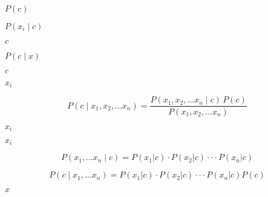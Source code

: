 \documentclass[10pt]{book}
\begin{document}
\begin{mdSnippets}
\begin{mdInlineSnippet}%
$P(c)$\end{mdInlineSnippet}%
\begin{mdInlineSnippet}%
$P(x_i \mid c)$\end{mdInlineSnippet}%
\begin{mdInlineSnippet}[4a8a08f09d37b73795649038408b5f33]%
$c$\end{mdInlineSnippet}%
\begin{mdInlineSnippet}[270623c12b8c5966e12b468eb215e89a]%
$P(c \mid x)$\end{mdInlineSnippet}%
\begin{mdInlineSnippet}[4a8a08f09d37b73795649038408b5f33]%
$c$\end{mdInlineSnippet}%
\begin{mdInlineSnippet}%
$x_i$\end{mdInlineSnippet}%
\begin{mdDisplaySnippet}%
\[%
P(c \mid x_1, x_2, ... x_n) = \frac{P(x_1,x_2, ... x_n \mid c) \, P(c)}{P(x_1,x_2, ... x_n)}
\]%
\end{mdDisplaySnippet}%
\begin{mdInlineSnippet}%
$x_i$\end{mdInlineSnippet}%
\begin{mdInlineSnippet}%
$x_i$\end{mdInlineSnippet}%
\begin{mdDisplaySnippet}[71b91f52921236d0e2b3c8ed7e65b48f]%
\[%
P(x_1, ... x_n \mid c) = P(x_1|c)⋅P(x_2|c)⋅⋅⋅P(x_n|c)
\]%
\end{mdDisplaySnippet}%
\begin{mdDisplaySnippet}[2cb4451452624fd0ce4c3afdd6d51f95]%
\[%
P(c \mid x_1, ... x_n) = P(x_1|c)⋅P(x_2|c)⋅⋅⋅P(x_n|c) P(c)
\]%
\end{mdDisplaySnippet}%
\begin{mdInlineSnippet}[9dd4e461268c8034f5c8564e155c67a6]%
$x$\end{mdInlineSnippet}%

\end{mdSnippets}
\end{document}
